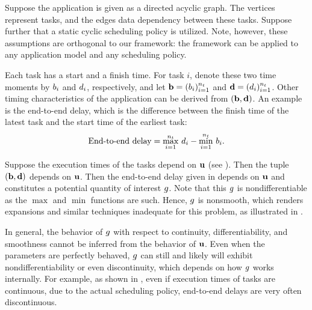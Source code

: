 Suppose the application is given as a directed acyclic graph. The vertices
represent tasks, and the edges data dependency between these tasks. Suppose
further that a static cyclic scheduling policy is utilized. Note, however, these
assumptions are orthogonal to our framework: the framework can be applied to any
application model and any scheduling policy.

Each task has a start and a finish time. For task $i$, denote these two time
moments by $b_i$ and $d_i$, respectively, and let $\mathbf{b} = (b_i)_{i=1}^{n_t}$ and
$\mathbf{d} = (d_i)_{i=1}^{n_t}$. Other timing characteristics of the application can be
derived from $(\mathbf{b}, \mathbf{d})$. An example is the end-to-end delay, which is the
difference between the finish time of the latest task and the start time of the
earliest task:
\begin{equation} \elab{end-to-end-delay}
  \text{End-to-end delay} = \max_{i = 1}^\nt \, \d_i - \min_{i = 1}^\nt \, \b_i.
\end{equation}

Suppose the execution times of the tasks depend on $\mathbf{u}$ (see ).
Then the tuple $(\mathbf{b}, \mathbf{d})$ depends on $\mathbf{u}$. Then the end-to-end delay given in
 depends on $\mathbf{u}$ and constitutes a potential quantity of
interest $g$. Note that this $g$ is nondifferentiable as the $\max$ and $\min$
functions are such. Hence, $g$ is nonsmooth, which renders  expansions
and similar techniques inadequate for this problem, as illustrated in
.

\begin{remark} 
In general, the behavior of $g$ with respect to continuity, differentiability,
and smoothness cannot be inferred from the behavior of $\mathbf{u}$. Even when the
parameters are perfectly behaved, $g$ can still and likely will exhibit
nondifferentiability or even discontinuity, which depends on how $g$ works
internally. For example, as shown in \cite{tanasa2015}, even if execution times
of tasks are continuous, due to the actual scheduling policy, end-to-end delays
are very often discontinuous.
\end{remark}
